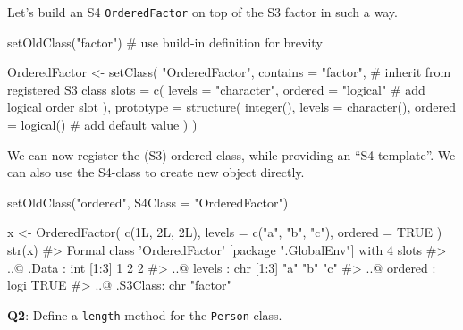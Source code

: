 \documentclass[
]{krantz}
\makeatletter
\newenvironment{Shaded}{\begin{snugshade}}{\end{snugshade}}
\newcommand{\CommentTok}[1]{\textcolor[rgb]{0.56,0.35,0.01}{\textit{#1}}}
\newcommand{\DataTypeTok}[1]{\textcolor[rgb]{0.13,0.29,0.53}{#1}}
\newcommand{\KeywordTok}[1]{\textcolor[rgb]{0.13,0.29,0.53}{\textbf{#1}}}
\newcommand{\NormalTok}[1]{#1}
\newcommand{\OtherTok}[1]{\textcolor[rgb]{0.56,0.35,0.01}{#1}}
\newcommand{\StringTok}[1]{\textcolor[rgb]{0.31,0.60,0.02}{#1}}
\newenvironment{kframe}{%
\medskip{}
\setlength{\fboxsep}{.8em}
 \def\at@end@of@kframe{}%
 \ifinner\ifhmode%
  \def\at@end@of@kframe{\end{minipage}}%
  \begin{minipage}{\columnwidth}%
 \fi\fi%
 \def\FrameCommand##1{\hskip\@totalleftmargin \hskip-\fboxsep
 \colorbox{shadecolor}{##1}\hskip-\fboxsep
     \hskip-\linewidth \hskip-\@totalleftmargin \hskip\columnwidth}%
 \MakeFramed {\advance\hsize-\width
   \@totalleftmargin\z@ \linewidth\hsize
   \@setminipage}}%
 {\par\unskip\endMakeFramed%
 \at@end@of@kframe}
\renewenvironment{Shaded}{\begin{kframe}}{\end{kframe}}
\renewcommand{\KeywordTok} [1]{\textcolor[rgb]{0.00,0.44,0.13}{{#1}}}
\renewcommand{\DataTypeTok}[1]{\textcolor[rgb]{0.56,0.13,0.00}{{#1}}}
\renewcommand{\StringTok}  [1]{\textcolor[rgb]{0.25,0.44,0.63}{{#1}}}
\renewcommand{\CommentTok} [1]{\textcolor[rgb]{0.38,0.63,0.69}{{#1}}}
\renewcommand{\OtherTok}   [1]{\textcolor[rgb]{0.00,0.44,0.13}{{#1}}}
\renewcommand{\NormalTok}  [1]{{#1}}
\makeatother
\begin{document}
Let's build an S4 \texttt{OrderedFactor} on top of the S3 factor in such a way.

\begin{Shaded}
\begin{Highlighting}[]
\KeywordTok{setOldClass}\NormalTok{(}\StringTok{"factor"}\NormalTok{)    }\CommentTok{# use build-in definition for brevity}

\NormalTok{OrderedFactor <-}\StringTok{ }\KeywordTok{setClass}\NormalTok{(}
  \StringTok{"OrderedFactor"}\NormalTok{,}
  \DataTypeTok{contains =} \StringTok{"factor"}\NormalTok{,   }\CommentTok{# inherit from registered S3 class}
  \DataTypeTok{slots =} \KeywordTok{c}\NormalTok{(}
    \DataTypeTok{levels =} \StringTok{"character"}\NormalTok{,}
    \DataTypeTok{ordered =} \StringTok{"logical"}  \CommentTok{# add logical order slot}
\NormalTok{  ),}
  \DataTypeTok{prototype =} \KeywordTok{structure}\NormalTok{(}
    \KeywordTok{integer}\NormalTok{(),}
    \DataTypeTok{levels =} \KeywordTok{character}\NormalTok{(),}
    \DataTypeTok{ordered =} \KeywordTok{logical}\NormalTok{()  }\CommentTok{# add default value}
\NormalTok{  )}
\NormalTok{)}
\end{Highlighting}
\end{Shaded}

We can now register the (S3) ordered-class, while providing an ``S4 template''. We can also use the S4-class to create new object directly.

\begin{Shaded}
\begin{Highlighting}[]
\KeywordTok{setOldClass}\NormalTok{(}\StringTok{"ordered"}\NormalTok{, }\DataTypeTok{S4Class =} \StringTok{"OrderedFactor"}\NormalTok{)}

\NormalTok{x <-}\StringTok{ }\KeywordTok{OrderedFactor}\NormalTok{(}
  \KeywordTok{c}\NormalTok{(1L, 2L, 2L),}
  \DataTypeTok{levels =} \KeywordTok{c}\NormalTok{(}\StringTok{"a"}\NormalTok{, }\StringTok{"b"}\NormalTok{, }\StringTok{"c"}\NormalTok{),}
  \DataTypeTok{ordered =} \OtherTok{TRUE}
\NormalTok{)}
\KeywordTok{str}\NormalTok{(x)}
\CommentTok{#> Formal class 'OrderedFactor' [package ".GlobalEnv"] with 4 slots}
\CommentTok{#>   ..@ .Data   : int [1:3] 1 2 2}
\CommentTok{#>   ..@ levels  : chr [1:3] "a" "b" "c"}
\CommentTok{#>   ..@ ordered : logi TRUE}
\CommentTok{#>   ..@ .S3Class: chr "factor"}
\end{Highlighting}
\end{Shaded}

\textbf{{Q2}}: Define a \texttt{length} method for the \texttt{Person} class.
\end{document}
